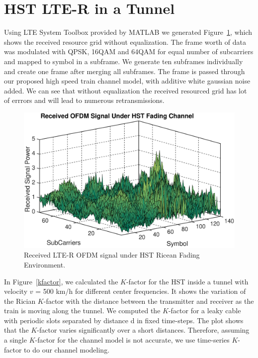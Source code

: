 \section{HST LTE-R in a Tunnel}
Using LTE System Toolbox provided by MATLAB we generated Figure~\ref{lteofdma}, which shows the received resource grid without equalization. The frame worth of data was modulated with QPSK, 16QAM and 64QAM for equal number of subcarriers and mapped to symbol in a subframe. We generate ten subframes individually and create one frame after merging all subframes. The frame is passed through our proposed high speed train channel model, with additive white gaussian noise added. We can see that without equalization the received resourced grid has lot of errrors and will lead to numerous retransmissions.

\begin{figure}[!ht]
\centering
\includegraphics[width=\textwidth,keepaspectratio]{images/Gill/lte_figs/receivedsignal.eps} 
\caption{Received LTE-R OFDM signal under HST Ricean Fading Environment.}
\label{lteofdma}
\end{figure}

In Figure~\ref{kfactor}, we calculated the $K$-factor for the HST inside a tunnel with velocity $v$ = 500 km/h for different center frequencies. It shows the variation of the Rician $K$-factor with the distance between the transmitter and receiver as the train is moving along the tunnel. We computed the $K$-factor for a leaky cable with periodic slots separated by distance d in fixed time-steps. The plot shows that the $K$-factor varies significantly over a short distances. Therefore, assuming a single $K$-factor for the channel model is not accurate, we use time-series $K$-factor to do our channel modeling.

